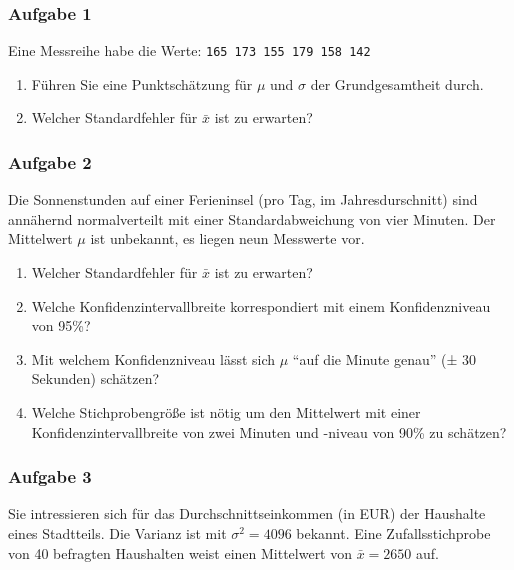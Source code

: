 \documentclass[
  ngerman,
]{article}
\providecommand{\tightlist}{%
  \setlength{\itemsep}{0pt}\setlength{\parskip}{0pt}}
\begin{document}
\hypertarget{aufgabe-1-3}{%
\subsubsection{Aufgabe 1}\label{aufgabe-1-3}}

Eine Messreihe habe die Werte:
\texttt{165\ 173\ 155\ 179\ 158\ 142}

\begin{enumerate}
\def\labelenumi{\alph{enumi})}
\tightlist
\item
  Führen Sie eine Punktschätzung für \(\mu\) und \(\sigma\) der Grundgesamtheit durch.
\item
  Welcher Standardfehler für \(\bar{x}\) ist zu erwarten?
\end{enumerate}

\hypertarget{aufgabe-2-3}{%
\subsubsection{Aufgabe 2}\label{aufgabe-2-3}}

Die Sonnenstunden auf einer Ferieninsel (pro Tag, im Jahresdurschnitt) sind annähernd normalverteilt mit einer Standardabweichung von vier Minuten. Der Mittelwert \(\mu\) ist unbekannt, es liegen neun Messwerte vor.

\begin{enumerate}
\def\labelenumi{\alph{enumi})}
\tightlist
\item
  Welcher Standardfehler für \(\bar{x}\) ist zu erwarten?
\item
  Welche Konfidenzintervallbreite korrespondiert mit einem Konfidenzniveau von 95\%?
\item
  Mit welchem Konfidenzniveau lässt sich \(\mu\) ``auf die Minute genau'' (± 30 Sekunden) schätzen?
\item
  Welche Stichprobengröße ist nötig um den Mittelwert mit einer Konfidenzintervallbreite von zwei Minuten und -niveau von 90\% zu schätzen?
\end{enumerate}

\hypertarget{aufgabe-3-1}{%
\subsubsection{Aufgabe 3}\label{aufgabe-3-1}}

Sie intressieren sich für das Durchschnittseinkommen (in EUR) der Haushalte eines Stadtteils. Die Varianz ist mit \(\sigma^2=4096\) bekannt. Eine Zufallsstichprobe von 40 befragten Haushalten weist einen Mittelwert von \(\bar{x}=2650\) auf.
\end{document}
